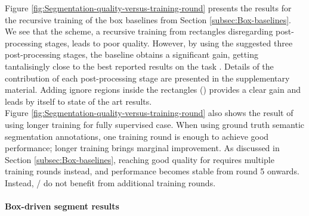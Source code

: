 \documentclass[10pt,english,british,twocolumn]{article}
\begin{document}
Figure \ref{fig:Segmentation-quality-versus-training-round} presents
the results for the recursive training of the box baselines from Section
\ref{subsec:Box-baselines}. We see that the  scheme,
a recursive training from rectangles disregarding post-processing
stages, leads to poor quality. However, by using the suggested three
post-processing stages, the  baseline obtains a significant
gain, getting tantalisingly close to the best reported results on
the task \cite{Dai2015Iccv}. Details of the contribution of each
post-processing stage are presented in the supplementary material.
Adding ignore regions inside the rectangles ()
provides a clear gain and leads by itself to state of the art results.\\
Figure \ref{fig:Segmentation-quality-versus-training-round} also
shows the result of using longer training for fully supervised case.
When using ground truth semantic segmentation annotations, one training
round is enough to achieve good performance; longer training brings
marginal improvement. As discussed in Section \ref{subsec:Box-baselines},
reaching good quality for  requires
multiple training rounds instead, and performance becomes stable from
round 5 onwards. Instead, /
do not benefit from additional training rounds.

\paragraph{Box-driven segment results}
\end{document}
